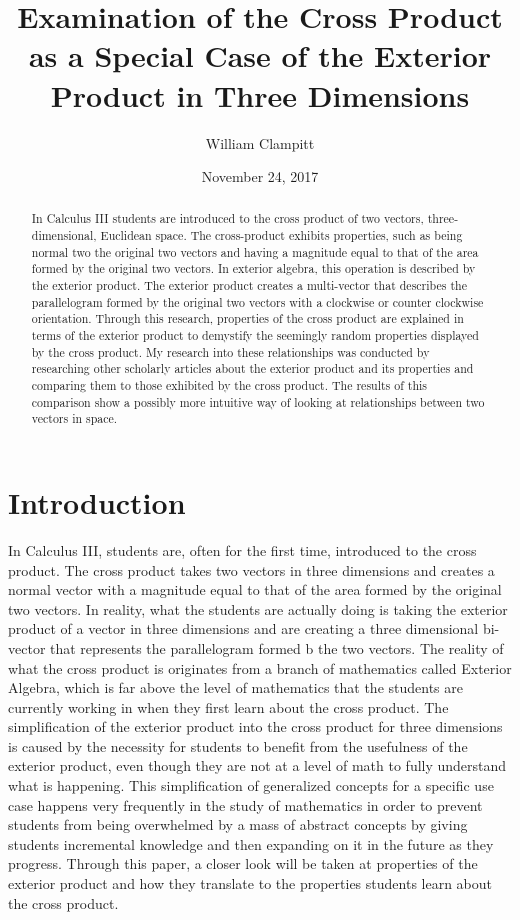 \documentclass[12]{amsart}
\title
[Examination of the Cross Product] %
{Examination of the Cross Product as a Special Case of the Exterior Product in Three Dimensions}
\author{William Clampitt}
\date{November 24, 2017}
\begin{document}
	
	\begin{abstract}
		In Calculus III students are introduced to the cross product of two vectors, three-dimensional, Euclidean space. The cross-product exhibits properties, such as being normal two the original two vectors and having a magnitude equal to that of the area formed by the original two vectors. In exterior algebra, this operation is described by the exterior product. The exterior product creates a multi-vector that describes the parallelogram formed by the original two vectors with a clockwise or counter clockwise orientation. Through this research, properties of the cross product are explained in terms of the exterior product to demystify the seemingly random properties displayed by the cross product. My research into these relationships was conducted by researching other scholarly articles about the exterior product and its properties and comparing them to those exhibited by the cross product. The results of this comparison show a possibly more intuitive way of looking at relationships between two vectors in space.
	\end{abstract}

	\maketitle
	\newpage

	\section{Introduction}
		In Calculus III, students are, often for the first time, introduced to the cross product. The cross product takes two vectors in three dimensions and creates a normal vector with a magnitude equal to that of the area formed by the original two vectors. In reality, what the students are actually doing is taking the exterior product of a vector in three dimensions and are creating a three dimensional bi-vector that represents the parallelogram formed b the two vectors. The reality of what the cross product is originates from a branch of mathematics called Exterior Algebra, which is far above the level of mathematics that the students are currently working in when they first learn about the cross product. The simplification of the exterior product into the cross product for three dimensions is caused by the necessity for students to benefit from the usefulness of the exterior product, even though they are not at a level of math to fully understand what is happening. This simplification of generalized concepts for a specific use case happens very frequently in the study of mathematics in order to prevent students from being overwhelmed by a mass of abstract concepts by giving students incremental knowledge and then expanding on it in the future as they progress. Through this paper, a closer look will be taken at properties of the exterior product and how they translate to the properties students learn about the cross product.
		
\end{document}
